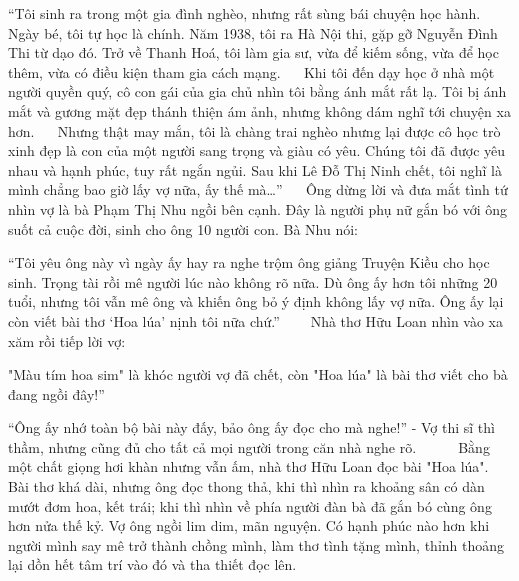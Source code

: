 \documentclass[../main.tex]{subfiles}
\begin{document}
\begin{multicols}{2}
“Tôi sinh ra trong một gia đình nghèo, nhưng rất sùng bái chuyện học hành. Ngày bé, tôi tự học là chính. Năm 1938, tôi ra Hà Nội thi, gặp gỡ Nguyễn Đình Thi từ dạo đó. Trở về Thanh Hoá, tôi làm gia sư, vừa để kiếm sống, vừa để học thêm, vừa có điều kiện tham gia cách mạng. 
    
Khi tôi đến dạy học ở nhà một người quyền quý, cô con gái của gia chủ nhìn tôi bằng ánh mắt rất lạ. Tôi bị ánh mắt và gương mặt đẹp thánh thiện ám ảnh, nhưng không dám nghĩ tới chuyện xa hơn. 
    
Nhưng thật may mắn, tôi là chàng trai nghèo nhưng lại được cô học trò xinh đẹp là con của một người sang trọng và giàu có yêu. Chúng tôi đã được yêu nhau và hạnh phúc, tuy rất ngắn ngủi. Sau khi Lê Đỗ Thị Ninh chết, tôi nghĩ là mình chẳng bao giờ lấy vợ nữa, ấy thế mà…” 
    
Ông dừng lời và đưa mắt tình tứ nhìn vợ là bà Phạm Thị Nhu ngồi bên cạnh. Đây là người phụ nữ gắn bó với ông suốt cả cuộc đời, sinh cho ông 10 người con. Bà Nhu nói: 
 
“Tôi yêu ông này vì ngày ấy hay ra nghe trộm ông giảng Truyện Kiều cho học sinh. Trọng tài rồi mê người lúc nào không rõ nữa. Dù ông ấy hơn tôi những 20 tuổi, nhưng tôi vẫn mê ông và khiến ông bỏ ý định không lấy vợ nữa. Ông ấy lại còn viết bài thơ ‘Hoa lúa’ nịnh tôi nữa chứ.” 
\textit{    } 
Nhà thơ Hữu Loan nhìn vào xa xăm rồi tiếp lời vợ: 
  
"Màu tím hoa sim" là khóc người vợ đã chết, còn "Hoa lúa" là bài thơ viết cho bà đang ngồi đây!” 
 
“Ông ấy nhớ toàn bộ bài này đấy, bảo ông ấy đọc cho mà nghe!” - Vợ thi sĩ thì thầm, nhưng cũng đủ cho tất cả mọi người trong căn nhà nghe rõ.  
\textit{  }    
Bằng một chất giọng hơi khàn nhưng vẫn ấm, nhà thơ Hữu Loan đọc bài "Hoa lúa". Bài thơ khá dài, nhưng ông đọc thong thả, khi thì nhìn ra khoảng sân có dàn mướt đơm hoa, kết trái; khi thì nhìn về phía người đàn bà đã gắn bó cùng ông hơn nửa thế kỷ. Vợ ông ngồi lim dim, mãn nguyện. Có hạnh phúc nào hơn khi người mình say mê trở thành chồng mình, làm thơ tình tặng mình, thỉnh thoảng lại dồn hết tâm trí vào đó và tha thiết đọc lên. 
\textbf{   } 
 

\end{multicols}
\end{document}
